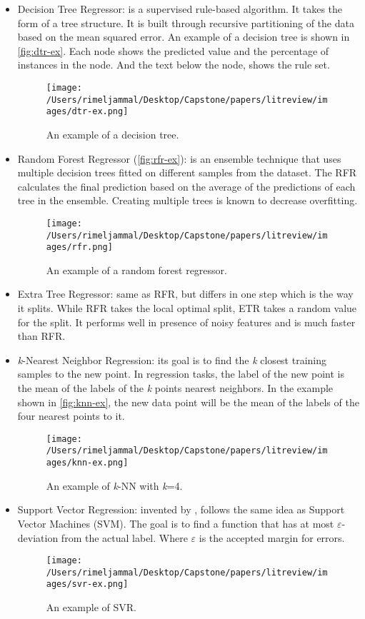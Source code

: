 \documentclass[]{article}
\begin{document}
	\begin{itemize}
		\item Decision Tree Regressor: is a supervised rule-based algorithm. It takes the form of a tree structure. It is built through recursive partitioning of the data based on the mean squared error. An example of a decision tree is shown in \autoref{fig:dtr-ex}. Each node shows the predicted value and the percentage of instances in the node. And the text below the node, shows the rule set.
		\FloatBarrier
		\begin{figure}[h]
			\centerline{\texttt{[image: /Users/rimeljammal/Desktop/Capstone/papers/litreview/images/dtr-ex.png]}}
			\caption{An example of a decision tree.}\label{fig:dtr-ex}
		\end{figure}
		\FloatBarrier
		\item Random Forest Regressor (\autoref{fig:rfr-ex}): is an ensemble technique that uses multiple decision trees fitted on different samples from the dataset. The RFR calculates the final prediction based on the average of the predictions of each tree in the ensemble. Creating multiple trees is known to decrease overfitting.
		\begin{figure}[h]
			\centerline{\texttt{[image: /Users/rimeljammal/Desktop/Capstone/papers/litreview/images/rfr.png]}}
			\caption{An example of a random forest regressor.}\label{fig:rfr-ex}
		\end{figure}
		\item Extra Tree Regressor: same as RFR, but differs in one step which is the way it splits. While RFR takes the local optimal split, ETR takes a random value for the split. It performs well in presence of noisy features and is much faster than RFR.
		\item \textit{k}-Nearest Neighbor Regression: its goal is to find the \textit{k} closest training samples to the new point. In regression tasks, the label of the new point is the mean of the labels of the \textit{k} points nearest neighbors. In the example shown in \autoref{fig:knn-ex}, the new data point will be the mean of the labels of the four nearest points to it.
		\FloatBarrier
		\begin{figure}[h]
			\centerline{\texttt{[image: /Users/rimeljammal/Desktop/Capstone/papers/litreview/images/knn-ex.png]}}
			\caption{An example of \textit{k}-NN with \textit{k}=4.}\label{fig:knn-ex}
		\end{figure}
		\FloatBarrier
		\break
		\item Support Vector Regression: invented by \cite{drucker1997support}, follows the same idea as Support Vector Machines (SVM). The goal is to find a function that has at most $\varepsilon$-deviation from the actual label. Where $\varepsilon$ is the accepted margin for errors.
		\FloatBarrier
		\begin{figure}[h]
			\centerline{\texttt{[image: /Users/rimeljammal/Desktop/Capstone/papers/litreview/images/svr-ex.png]}}
			\caption{An example of SVR.}\label{fig:svr-ex}
		\end{figure}
		\FloatBarrier
	\end{itemize}
\break
\end{document}
